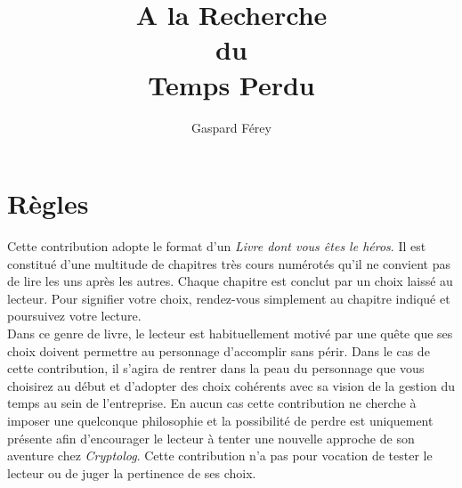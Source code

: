 \documentclass[12pt,a4paper,titlepage]{article}
\author{Gaspard Férey}
\title{A la Recherche \\ du \\ Temps Perdu}
\newcommand{\Cryptolog}{\emph{Cryptolog}}
\begin{document}
\maketitle

\section*{Règles}

Cette contribution adopte le format d'un \emph{Livre dont vous êtes le héros}. Il est constitué d'une multitude de chapitres très cours numérotés qu'il ne convient pas de lire les uns après les autres. Chaque chapitre est conclut par un choix laissé au lecteur. Pour signifier votre choix, rendez-vous simplement au chapitre indiqué et poursuivez
votre lecture.\\

Dans ce genre de livre, le lecteur est habituellement motivé par une quête que ses choix doivent permettre au personnage d'accomplir sans périr. Dans le cas de cette contribution, il s'agira de rentrer dans la peau du personnage que vous choisirez au début et d'adopter des choix cohérents avec sa vision de la gestion du temps au sein de l'entreprise.
En aucun cas cette contribution ne cherche à imposer une quelconque philosophie et la possibilité de perdre est uniquement présente afin d'encourager le lecteur à tenter une nouvelle approche de son aventure chez \Cryptolog. Cette contribution n'a pas pour vocation de tester le lecteur ou de juger la pertinence de ses choix.\\
\end{document}
